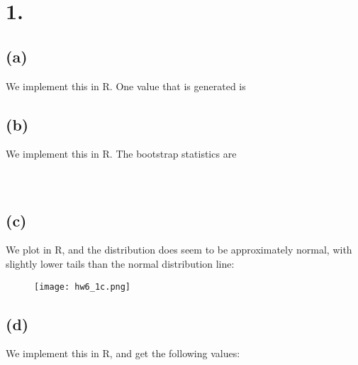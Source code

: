 \documentclass{article}
\begin{document}
\thispagestyle{firstpageheader}

\section*{1.}
{\Large 



\subsection*{(a)}

We implement this in R. One value that is generated is \\

\subsection*{(b)}

We implement this in R. The bootstrap statistics are \\
 \\
 \\

\subsection*{(c)}

We plot in R, and the distribution does seem to be approximately normal, with slightly lower tails than the normal distribution line:
\begin{figure}[h!]
  \centering
  \texttt{[image: hw6\_1c.png]}
\end{figure}

\subsection*{(d)}

We implement this in R, and get the following values: \\ 
 \\ 

}
\end{document}
